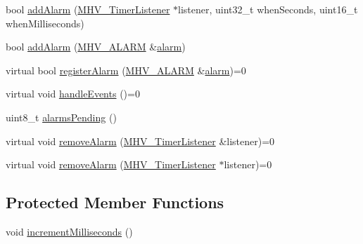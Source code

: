 \begin{DoxyCompactItemize}
\item 
bool \hyperlink{class_m_h_v___r_t_c_a64fab0fcc6e61e087c5424ef2e456d4a}{add\-Alarm} (\hyperlink{class_m_h_v___timer_listener}{M\-H\-V\-\_\-\-Timer\-Listener} $\ast$listener, uint32\-\_\-t when\-Seconds, uint16\-\_\-t when\-Milliseconds)
\item 
bool \hyperlink{class_m_h_v___r_t_c_ac58061c6f016d665a9027f8d55b9d5c0}{add\-Alarm} (\hyperlink{_m_h_v___r_t_c_8h_af13307658f41fba330ffae04dd5cbce6}{M\-H\-V\-\_\-\-A\-L\-A\-R\-M} \&\hyperlink{class_m_h_v___r_t_c_a949570f89977560cc68dc909e7d0a805}{alarm})
\item 
virtual bool \hyperlink{class_m_h_v___r_t_c_a9f602280028deadd62f71fc85c6115cc}{register\-Alarm} (\hyperlink{_m_h_v___r_t_c_8h_af13307658f41fba330ffae04dd5cbce6}{M\-H\-V\-\_\-\-A\-L\-A\-R\-M} \&\hyperlink{class_m_h_v___r_t_c_a949570f89977560cc68dc909e7d0a805}{alarm})=0
\item 
virtual void \hyperlink{class_m_h_v___r_t_c_a07fd618ada2e83e34632a637485fb59d}{handle\-Events} ()=0
\item 
uint8\-\_\-t \hyperlink{class_m_h_v___r_t_c_a78c9916568b91c43ba000a8fa851e3e5}{alarms\-Pending} ()
\item 
virtual void \hyperlink{class_m_h_v___r_t_c_a0a0d7e7449118faae9e3b9d2453196b0}{remove\-Alarm} (\hyperlink{class_m_h_v___timer_listener}{M\-H\-V\-\_\-\-Timer\-Listener} \&listener)=0
\item 
virtual void \hyperlink{class_m_h_v___r_t_c_a07000693b6d6f05b1a1b6fc12ebeb77b}{remove\-Alarm} (\hyperlink{class_m_h_v___timer_listener}{M\-H\-V\-\_\-\-Timer\-Listener} $\ast$listener)=0
\end{DoxyCompactItemize}
\subsection*{Protected Member Functions}
\begin{DoxyCompactItemize}
\item 
void \hyperlink{class_m_h_v___r_t_c_adfdc40d1583e116656b3ac0310270c33}{increment\-Milliseconds} ()
\end{DoxyCompactItemize}
